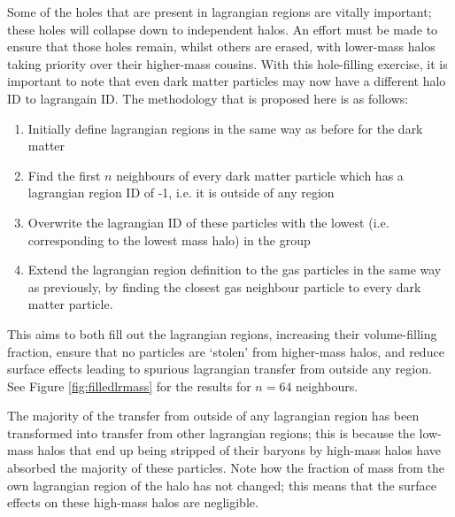 Some of the holes that are present in lagrangian regions are vitally important;
these holes will collapse down to independent halos. An effort must be made to
ensure that those holes remain, whilst others are erased, with lower-mass halos
taking priority over their higher-mass cousins. With this hole-filling
exercise, it is important to note that even dark matter particles may now have
a different halo ID to lagrangain ID. The methodology that is proposed here is
as follows:
\begin{enumerate}
    \item Initially define lagrangian regions in the same way as before for
          the dark matter
    \item Find the first $n$ neighbours of every dark matter particle which
          has a lagrangian region ID of -1, i.e. it is outside of any region
    \item Overwrite the lagrangian ID of these particles with the lowest (i.e.
          corresponding to the lowest mass halo) in the group
    \item Extend the lagrangian region definition to the gas particles in
          the same way as previously, by finding the closest gas neighbour
	  particle to every dark matter particle.
\end{enumerate}
This aims to both fill out the lagrangian regions, increasing their
volume-filling fraction, ensure that no particles are `stolen' from higher-mass
halos, and reduce surface effects leading to spurious lagrangian transfer from
outside any region. See Figure \ref{fig:filledlrmass} for the results for
$n=64$ neighbours.

The majority of the transfer from outside of any lagrangian region has been
transformed into transfer from other lagrangian regions; this is because the
low-mass halos that end up being stripped of their baryons by high-mass halos
have absorbed the majority of these particles. Note how the fraction of mass
from the own lagrangian region of the halo has not changed; this means that the
surface effects on these high-mass halos are negligible.
